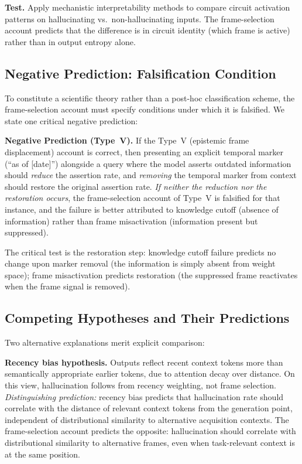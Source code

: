 \documentclass[12pt]{article}
\begin{document}
\textbf{Test.} Apply mechanistic interpretability methods to
compare circuit activation patterns on hallucinating vs.\
non-hallucinating inputs. The frame-selection account predicts
that the difference is in circuit identity (which frame is
active) rather than in output entropy alone.

\subsection{Negative Prediction: Falsification Condition}

To constitute a scientific theory rather than a post-hoc
classification scheme, the frame-selection account must
specify conditions under which it is falsified.
We state one critical negative prediction:

\textbf{Negative Prediction (Type~V).}
If the Type~V (epistemic frame displacement) account is correct,
then presenting an explicit temporal marker (``as of [date]'')
alongside a query where the model asserts outdated information
should \emph{reduce} the assertion rate, and \emph{removing}
the temporal marker from context should restore the original
assertion rate.
\emph{If neither the reduction nor the restoration occurs},
the frame-selection account of Type~V is falsified for that
instance, and the failure is better attributed to knowledge
cutoff (absence of information) rather than frame misactivation
(information present but suppressed).

The critical test is the restoration step: knowledge cutoff
failure predicts no change upon marker removal (the information
is simply absent from weight space); frame misactivation
predicts restoration (the suppressed frame reactivates when
the frame signal is removed).

\subsection{Competing Hypotheses and Their Predictions}

Two alternative explanations merit explicit comparison:

\textbf{Recency bias hypothesis.}
Outputs reflect recent context tokens more than semantically
appropriate earlier tokens, due to attention decay over distance.
On this view, hallucination follows from recency weighting,
not frame selection.
\emph{Distinguishing prediction:} recency bias predicts that
hallucination rate should correlate with the distance of
relevant context tokens from the generation point, independent
of distributional similarity to alternative acquisition contexts.
The frame-selection account predicts the opposite: hallucination
should correlate with distributional similarity to alternative
frames, even when task-relevant context is at the same position.
\end{document}
